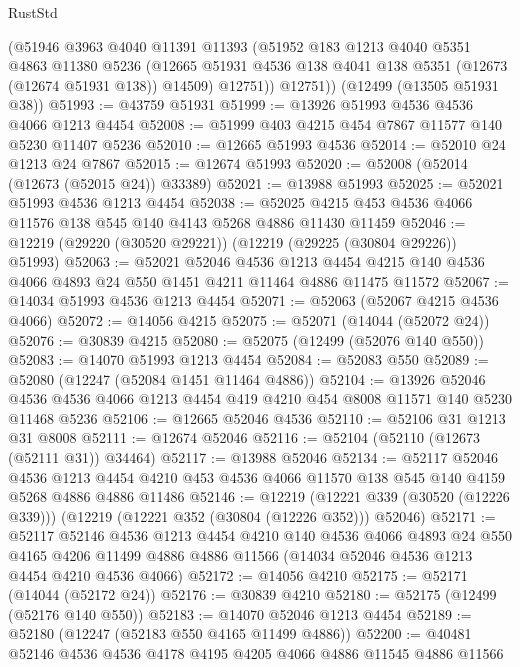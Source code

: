 \begin{lexlean}{RustStd}
\begin{coremodule}
        (@51946
          @3963
          @4040
          @11391
          @11393
          (@51952
            @183
            @1213
            @4040
            @5351
            @4863
            @11380
            @5236
            (@12665 @51931 @4536 @138 @4041 @138 @5351 (@12673 (@12674 @51931 @138)) @14509)
            @12751))
        @12751))
    (@12499 (@13505 @51931 @38))
@51993 := @43759 @51931
@51999 := @13926 @51993 @4536 @4536 @4066 @1213 @4454
@52008 := @51999 @403 @4215 @454 @7867 @11577 @140 @5230 @11407 @5236
@52010 := @12665 @51993 @4536
@52014 := @52010 @24 @1213 @24 @7867
@52015 := @12674 @51993
@52020 := @52008 (@52014 (@12673 (@52015 @24)) @33389)
@52021 := @13988 @51993
@52025 := @52021 @51993 @4536 @1213 @4454
@52038 := @52025 @4215 @453 @4536 @4066 @11576 @138 @545 @140 @4143 @5268 @4886 @11430 @11459
@52046 := @12219 (@29220 (@30520 @29221)) (@12219 (@29225 (@30804 @29226)) @51993)
@52063 := @52021
    @52046
    @4536
    @1213
    @4454
    @4215
    @140
    @4536
    @4066
    @4893
    @24
    @550
    @1451
    @4211
    @11464
    @4886
    @11475
    @11572
@52067 := @14034 @51993 @4536 @1213 @4454
@52071 := @52063 (@52067 @4215 @4536 @4066)
@52072 := @14056 @4215
@52075 := @52071 (@14044 (@52072 @24))
@52076 := @30839 @4215
@52080 := @52075 (@12499 (@52076 @140 @550))
@52083 := @14070 @51993 @1213 @4454
@52084 := @52083 @550
@52089 := @52080 (@12247 (@52084 @1451 @11464 @4886))
@52104 := @13926
    @52046
    @4536
    @4536
    @4066
    @1213
    @4454
    @419
    @4210
    @454
    @8008
    @11571
    @140
    @5230
    @11468
    @5236
@52106 := @12665 @52046 @4536
@52110 := @52106 @31 @1213 @31 @8008
@52111 := @12674 @52046
@52116 := @52104 (@52110 (@12673 (@52111 @31)) @34464)
@52117 := @13988 @52046
@52134 := @52117
    @52046
    @4536
    @1213
    @4454
    @4210
    @453
    @4536
    @4066
    @11570
    @138
    @545
    @140
    @4159
    @5268
    @4886
    @4886
    @11486
@52146 := @12219
    (@12221 @339 (@30520 (@12226 @339)))
    (@12219 (@12221 @352 (@30804 (@12226 @352))) @52046)
@52171 := @52117
    @52146
    @4536
    @1213
    @4454
    @4210
    @140
    @4536
    @4066
    @4893
    @24
    @550
    @4165
    @4206
    @11499
    @4886
    @4886
    @11566
    (@14034 @52046 @4536 @1213 @4454 @4210 @4536 @4066)
@52172 := @14056 @4210
@52175 := @52171 (@14044 (@52172 @24))
@52176 := @30839 @4210
@52180 := @52175 (@12499 (@52176 @140 @550))
@52183 := @14070 @52046 @1213 @4454
@52189 := @52180 (@12247 (@52183 @550 @4165 @11499 @4886))
@52200 := @40481 @52146 @4536 @4536 @4178 @4195 @4205 @4066 @4886 @11545 @4886 @11566

\end{coremodule}
\end{lexlean}
